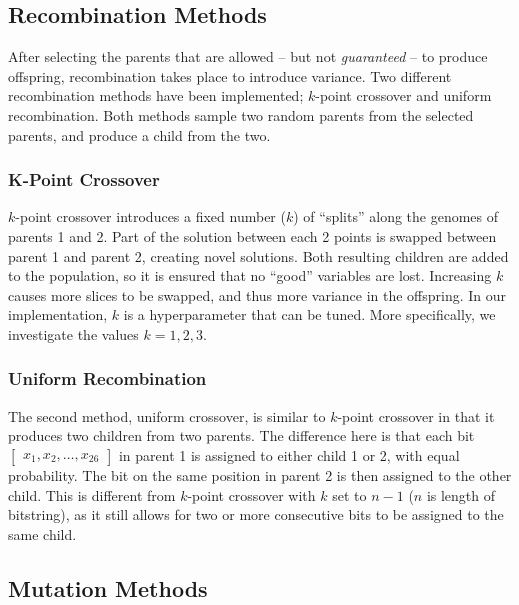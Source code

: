 \documentclass{article}
\begin{document}
\newpage


\subsection{Recombination Methods}
\label{subsec:ga_rec}

After selecting the parents that are allowed -- but not \textit{guaranteed} -- to produce offspring, recombination takes place to introduce variance.
Two different recombination methods have been implemented; $k$-point crossover and uniform recombination.
Both methods sample two random parents from the selected parents, and produce a child from the two.

\subsubsection*{K-Point Crossover}
\label{subsubsec:ga_rec_kp}
$k$-point crossover introduces a fixed number ($k$) of ``splits'' along the genomes of parents 1 and 2.
Part of the solution between each 2 points is swapped between parent 1 and parent 2, creating novel solutions.
Both resulting children are added to the population, so it is ensured that no ``good'' variables are lost.
Increasing $k$ causes more slices to be swapped, and thus more variance in the offspring.
In our implementation, $k$ is a hyperparameter that can be tuned.
More specifically, we investigate the values $k=1, 2, 3$.

\subsubsection*{Uniform Recombination}
\label{subsubsec:ga_rec_uc}
The second method, uniform crossover, is similar to $k$-point crossover in that it produces two children from two parents.
The difference here is that each bit $\begin{bmatrix} x_1, x_2, \dots, x_{26}\end{bmatrix}$ in parent 1 is assigned to either child 1 or 2, with equal probability.
The bit on the same position in parent 2 is then assigned to the other child.
This is different from $k$-point crossover with $k$ set to $n-1$ ($n$ is length of bitstring), as it still allows for two or more consecutive bits to be assigned to the same child.


\subsection{Mutation Methods}
\label{subsec:ga_mut}
\end{document}
